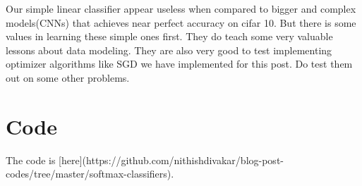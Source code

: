 \documentclass[12pt,crop=false,class=article,convert={density=300,outext=.compiled.png}]{standalone}
\begin{document}
Our simple linear classifier appear useless when compared to bigger and
complex models(CNNs) that achieves near perfect accuracy on cifar 10.
But there is some values in learning these simple ones first. They do
teach some very valuable lessons about data modeling. They are also
very good to test implementing optimizer algorithms like SGD we have
implemented for this post. Do test them out on some other problems.

\section*{Code}


The code is
[here](https://github.com/nithishdivakar/blog-post-codes/tree/master/softmax-classifiers).
\end{document}
